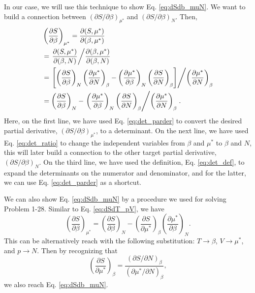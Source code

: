 \documentclass[twocolumn, 10pt]{article}
\numberwithin{equation}{section}
\begin{document}
In our case,
we will use this technique to show Eq. \eqref{eq:dSdb_muN}.
%
We want to build a connection between
$(\partial S/\partial \beta)_{\mu^*}$
and
$(\partial S/\partial \beta)_{N}$.
Then,
\begin{align*}
  &\left( \frac{ \partial S } {\partial \beta } \right)_{\mu^*}
  =
  \frac{ \partial (S, \mu^*) } { \partial (\beta, \mu^*) }
  \\
  &=
  \left.
  \frac{ \partial (S, \mu^*) } { \partial (\beta, N) }
  \middle/
  \frac{ \partial (\beta, \mu^*) } { \partial (\beta, N) }
  \right.
  \\
  &=
  \left.
  \left[
  \left( \frac{ \partial S } {\partial \beta } \right)_{N}
  \left( \frac{ \partial \mu^* } {\partial N } \right)_{\beta}
  -
  \left( \frac{ \partial \mu^* } {\partial \beta } \right)_{N}
  \left( \frac{ \partial S } {\partial N } \right)_{\beta}
  \right]
  \middle/
  \left( \frac{ \partial \mu^* } {\partial N } \right)_{\beta}
  \right.
  \\
  &=
  \left( \frac{ \partial S } {\partial \beta } \right)_{N}
  -
  \left.
  \left( \frac{ \partial \mu^* } {\partial \beta } \right)_{N}
  \left( \frac{ \partial S } {\partial N } \right)_{\beta}
  \middle/
  \left( \frac{ \partial \mu^* } {\partial N } \right)_{\beta}
  \right.
  .
\end{align*}
Here, on the first line, we have used Eq. \eqref{eq:det_parder}
to convert the desired partial derivative,
$(\partial S/\partial \beta)_{\mu^*}$,
to a determinant.
%
On the next line, we have used Eq. \eqref{eq:det_ratio}
to change the independent variables from $\beta$ and $\mu^*$
to $\beta$ and $N$,
this will later build a connection
to the other target partial derivative,
$(\partial S/\partial \beta)_N$.
%
On the third line, we have used the definition,
Eq. \eqref{eq:det_def},
to expand the determinants on the numerator and denominator,
and for the latter,
we can use Eq. \eqref{eq:det_parder} as a shortcut.
%

We can also show Eq. \eqref{eq:dSdb_muN}
by a procedure we used for solving Problem 1-28.
%
Similar to Eq. \eqref{eq:dSdT_pV}, we have
$$
  \left( \frac{ \partial S } {\partial \beta } \right)_{\mu^*}
  =
  \left( \frac{ \partial S } {\partial \beta } \right)_{N}
  -
  \left( \frac{ \partial S } {\partial \mu^* } \right)_{\beta}
  \left( \frac{ \partial \mu^* } {\partial \beta } \right)_{N}
  .
$$
This can be alternatively reach
with the following substitution:
$T \to \beta$, $V \to \mu^*$, and $p \to N$.
%
Then by recognizing that
$$
\left( \frac{ \partial S } { \partial \mu^* } \right)_\beta
=
\frac{
  (\partial S / \partial N)_{\beta}
} {
  (\partial \mu^* / \partial N)_{\beta}
},
$$
we also reach Eq. \eqref{eq:dSdb_muN}.
\end{document}
